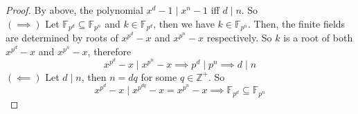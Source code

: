 \documentclass[hidelinks,12pt]{article}
\newcommand{\Z}{\mathbb{Z}}
\newcommand{\F}{\mathbb{F}}
\begin{document}
\begin{enumerate}
        \begin{proof}
        By above, the polynomial \(x^{d}-1\mid x^{n}-1\) iff \(d\mid n\). So \\
        \((\implies)\) Let \(\F_{p^{d}}\subseteq\F_{p^{n}}\) and \(k\in\F_{p^{d}}\), then we have \(k\in\F_{p^{n}}\).
    Then, the finite fields are determined by roots of \(x^{p^{d}}-x\) and \(x^{p^{n}}-x\) respectively. So \(k\) is a root of both \(x^{p^{d}}-x\) and \(x^{p^{n}}-x\), therefore \[
    x^{p^{d}}-x\mid x^{p^{n}}-x\implies p^{d}\mid p^{n}\implies d\mid n
    \]
   \((\impliedby)\) Let \(d\mid n\), then \(n=dq\) for some \(q\in\Z^{+}\). So
   \[
       x^{p^{d}}-x\mid x^{p^{dq}}-x=x^{p^{n}}-x\implies\F_{p^{d}}\subseteq\F_{p^{n}}
   \]
        \end{proof}
\end{enumerate}
\end{document}
